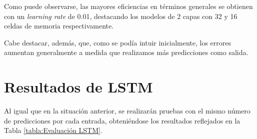 Como puede observarse, las mayores eficiencias en términos generales se obtienen 
con un \textit{learning rate} de 0.01, destacando los modelos de 2 capas con 
32 y 16 celdas de memoria respectivamente.

Cabe destacar, además, que, como se podía intuir inicialmente, los errores aumentan generalmente
a medida que realizamos más predicciones como salida.

\newpage

\section{Resultados de LSTM}
Al igual que en la situación anterior, se realizarán pruebas con el mismo número de predicciones
por cada entrada, obteniéndose los resultados reflejados en la Tabla \ref{tabla:Evaluación LSTM}.

